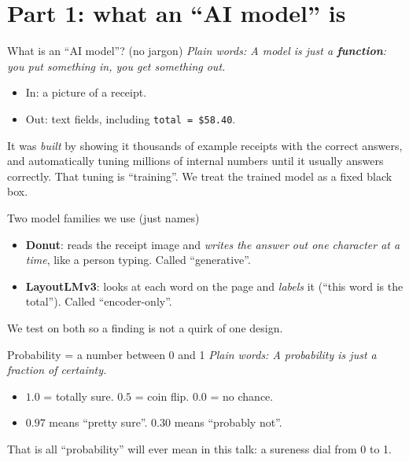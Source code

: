 \documentclass[aspectratio=169]{beamer}
\newcommand{\keybox}[1]{\begin{center}\colorbox{grey!15}{\parbox{0.92\linewidth}{\centering #1}}\end{center}}
\newcommand{\plain}[1]{\textit{\textcolor{sig}{Plain words:} #1}}
\begin{document}
\section{Part 1: what an ``AI model'' is}
\begin{frame}{What is an ``AI model''? (no jargon)}
\plain{A model is just a \textbf{function}: you put something in, you
get something out.}
\vspace{0.8em}
\begin{itemize}
\item In: a picture of a receipt.
\item Out: text fields, including \texttt{total = \$58.40}.
\end{itemize}
\vspace{0.8em}
It was \emph{built} by showing it thousands of example receipts with
the correct answers, and automatically tuning millions of internal
numbers until it usually answers correctly. That tuning is
``training''. We treat the trained model as a fixed black box.
\end{frame}

\begin{frame}{Two model families we use (just names)}
\begin{itemize}
\item \textbf{Donut}: reads the receipt image and \emph{writes the
answer out one character at a time}, like a person typing. Called
``generative''.
\item \textbf{LayoutLMv3}: looks at each word on the page and
\emph{labels} it (``this word is the total''). Called
``encoder-only''.
\end{itemize}
\vspace{1em}
\keybox{We test on both so a finding is not a quirk of one design.}
\end{frame}

\begin{frame}{Probability = a number between 0 and 1}
\plain{A probability is just a fraction of certainty.}
\begin{itemize}
\item $1.0$ = totally sure. \quad $0.5$ = coin flip. \quad $0.0$ = no
chance.
\item $0.97$ means ``pretty sure''. $0.30$ means ``probably not''.
\end{itemize}
\vspace{1em}
That is all ``probability'' will ever mean in this talk: a sureness
dial from 0 to 1.
\end{frame}
\end{document}
